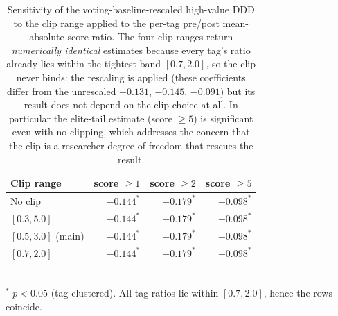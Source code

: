 \begin{table}[ht]
\centering
\caption{Sensitivity of the voting-baseline-rescaled high-value DDD to
the clip range applied to the per-tag pre/post mean-absolute-score
ratio. The four clip ranges return \emph{numerically identical}
estimates because every tag's ratio already lies within the tightest
band $[0.7, 2.0]$, so the clip never binds: the rescaling is applied
(these coefficients differ from the unrescaled $-0.131$, $-0.145$,
$-0.091$) but its result does not depend on the clip choice at all. In
particular the elite-tail estimate (score $\geq 5$) is significant even
with no clipping, which addresses the concern that the clip is a
researcher degree of freedom that rescues the result.}
\label{tab:clip_sensitivity}
\small
\begin{tabular}{lrrr}
\toprule
Clip range & score $\geq 1$ & score $\geq 2$ & score $\geq 5$ \\
\midrule
No clip            & $-0.144^{*}$ & $-0.179^{*}$ & $-0.098^{*}$ \\
$[0.3, 5.0]$       & $-0.144^{*}$ & $-0.179^{*}$ & $-0.098^{*}$ \\
$[0.5, 3.0]$ (main) & $-0.144^{*}$ & $-0.179^{*}$ & $-0.098^{*}$ \\
$[0.7, 2.0]$       & $-0.144^{*}$ & $-0.179^{*}$ & $-0.098^{*}$ \\
\bottomrule
\end{tabular}
\\[2pt]\footnotesize $^{*}$ $p<0.05$ (tag-clustered). All tag ratios lie
within $[0.7, 2.0]$, hence the rows coincide.
\end{table}
